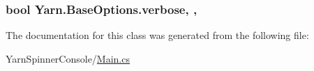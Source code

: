 \hypertarget{a00022_ada4d83d1756918f362d55f6649b82b17}{
\subsubsection[{verbose}]{\setlength{\rightskip}{0pt plus 5cm}bool Yarn.\-Base\-Options.\-verbose\hspace{0.3cm}{\ttfamily [get]}, {\ttfamily [set]}, {\ttfamily [inherited]}}}\label{a00022_ada4d83d1756918f362d55f6649b82b17}


The documentation for this class was generated from the following file\-:\begin{DoxyCompactItemize}
\item 
Yarn\-Spinner\-Console/\hyperlink{a00274}{Main.\-cs}\end{DoxyCompactItemize}
